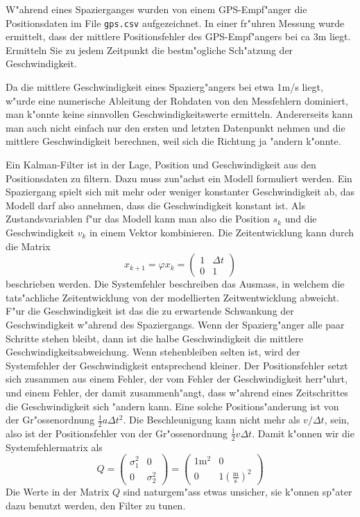 W"ahrend eines Spazierganges wurden von einem GPS-Empf"anger die
Positionsdaten im File \texttt{gps.csv} aufgezeichnet.
In einer fr"uhren Messung wurde ermittelt, dass der mittlere Positionsfehler
des GPS-Empf"angers bei ca 3m liegt.
Ermitteln Sie zu jedem Zeitpunkt die bestm"ogliche Sch"atzung 
der Geschwindigkeit.

\begin{loesung}
Da die mittlere Geschwindigkeit eines Spazierg"angers bei etwa 1m/s liegt,
w"urde eine numerische Ableitung der Rohdaten von den Messfehlern dominiert,
man k"onnte keine sinnvollen Geschwindigkeitswerte ermitteln.
Andererseits kann man auch nicht einfach nur den ersten und letzten
Datenpunkt nehmen und die mittlere Geschwindigkeit berechnen, weil
sich die Richtung ja "andern k"onnte.

Ein Kalman-Filter ist in der Lage, Position und Geschwindigkeit aus
den Positionsdaten zu filtern. Dazu muss zun"achst ein Modell formuliert
werden. Ein Spaziergang spielt sich mit mehr oder weniger konstanter
Geschwindigkeit ab, das Modell darf also annehmen, dass die Geschwindigkeit
konstant ist. Als Zustandsvariablen f"ur das Modell kann man also die
Position $s_k$ und die Geschwindigkeit $v_k$ in einem Vektor kombinieren.
Die Zeitentwicklung kann durch die Matrix
\begin{equation}
x_{k+1}=\varphi x_k=\begin{pmatrix}1&\Delta t\\0&1\end{pmatrix}
\end{equation}
beschrieben werden. Die Systemfehler beschreiben das Ausmass, in
welchem die tats"achliche Zeitentwicklung von der modellierten
Zeitwentwicklung abweicht.
F"ur die Geschwindigkeit ist das die zu erwartende Schwankung der
Geschwindigkeit w"ahrend des Spaziergangs. Wenn der Spazierg"anger
alle paar Schritte stehen bleibt, dann ist die halbe Geschwindigkeit
die mittlere Geschwindigkeitsabweichung. Wenn stehenbleiben selten
ist, wird der Systemfehler der Geschwindigkeit entsprechend kleiner.
Der Positionsfehler setzt sich zusammen aus einem Fehler, der vom
Fehler der Geschwindigkeit herr"uhrt, und einem Fehler, der damit
zusammenh"angt, dass w"ahrend eines Zeitschrittes die Geschwindigkeit
sich "andern kann. Eine solche Positions"anderung ist von
der Gr"ossenordnung $\frac12a\Delta t^2$. Die Beschleunigung kann nicht
mehr als $v/\Delta t$, sein, also ist der Positionsfehler von der
Gr"ossenordnung $\frac12v \Delta t$. Damit k"onnen wir die Systemfehlermatrix
als
\[
Q=
\begin{pmatrix}
\sigma_1^2&0\\0&\sigma_2^2
\end{pmatrix}
=
\begin{pmatrix}
1\text{m}^2&0\\
0&1\left(\frac{\text{m}}{\text{s}}\right)^2
\end{pmatrix}
\]
Die Werte in der Matrix $Q$ sind naturgem"ass etwas unsicher, sie k"onnen
sp"ater dazu benutzt werden, den Filter zu tunen.


\end{loesung}
